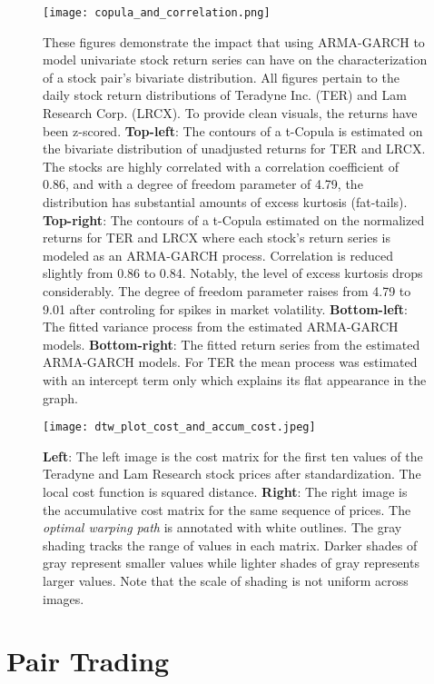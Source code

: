 \documentclass[12pt]{report}
\begin{document}
\begin{figure}
    \centering
    \texttt{[image: copula\_and\_correlation.png]}
    \caption{These figures demonstrate the impact that using ARMA-GARCH to model univariate stock return series can have on the characterization of a stock pair's bivariate distribution. All figures pertain to the daily stock return distributions of Teradyne Inc. (TER) and Lam Research Corp. (LRCX). To provide clean visuals, the returns have been z-scored. \textbf{Top-left}: The contours of a t-Copula is estimated on the bivariate distribution of unadjusted returns for TER and LRCX. The stocks are highly correlated with a correlation coefficient of 0.86, and with a degree of freedom parameter of 4.79, the distribution has substantial amounts of excess kurtosis (fat-tails). \textbf{Top-right}: The contours of a t-Copula estimated on the normalized returns for TER and LRCX where each stock's return series is modeled as an ARMA-GARCH process. Correlation is reduced slightly from 0.86 to 0.84. Notably, the level of excess kurtosis drops considerably. The degree of freedom parameter raises from 4.79 to 9.01 after controling for spikes in market volatility. \textbf{Bottom-left}: The fitted variance process from the estimated ARMA-GARCH models. \textbf{Bottom-right}: The fitted return series from the estimated ARMA-GARCH models. For TER the mean process was estimated with an intercept term only which explains its flat appearance in the graph.}
    \label{fig:copula_and_correlation}
\end{figure}


\begin{figure}
    \centering
    \texttt{[image: dtw\_plot\_cost\_and\_accum\_cost.jpeg]}
    \caption{\textbf{Left}: The left image is the cost matrix for the first ten values of the Teradyne and Lam Research stock prices after standardization. The local cost function is squared distance. \textbf{Right}: The right image is the accumulative cost matrix for the same sequence of prices. The \textit{optimal warping path} is annotated with white outlines. The gray shading tracks the range of values in each matrix. Darker shades of gray represent smaller values while lighter shades of gray represents larger values. Note that the scale of shading is not uniform across images.}
    \label{fig:dtw_plot_cost_and_accum_cost}
\end{figure}

\chapter{Pair Trading} \label{sec:PairTrading}
\end{document}
